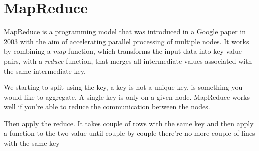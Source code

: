 \section{MapReduce}
MapReduce is a programming model that was introduced in a Google paper in $2003$ with the aim of accelerating parallel processing of multiple nodes. It works by combining a \textit{map} function, which transforms the input data into key-value pairs, with a \textit{reduce} function, that merges all intermediate values associated with the same intermediate key.

We starting to split using the key, a key is not a unique key, is something you would like to aggregate. A single key is only on a given node. MapReduce works well if you’re able to reduce the communication between the nodes.

Then apply the reduce. It takes couple of rows with the same key and then apply a function to the two value until couple by couple there’re no more couple of lines with the same key

\newpage